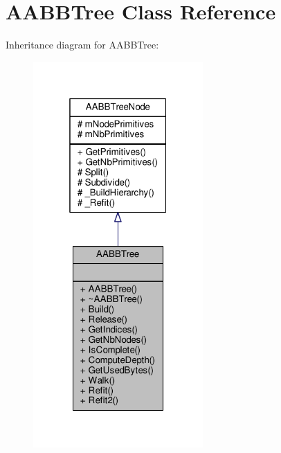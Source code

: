 \hypertarget{classAABBTree}{}\section{A\+A\+B\+B\+Tree Class Reference}
\label{classAABBTree}


Inheritance diagram for A\+A\+B\+B\+Tree\+:
\nopagebreak
\begin{figure}[H]
\begin{center}
\leavevmode
\includegraphics[width=184pt]{d5/d3e/classAABBTree__inherit__graph}
\end{center}
\end{figure}


